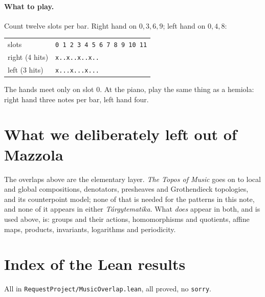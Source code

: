\documentclass[11pt,a4paper]{article}
\newcommand{\lean}[1]{\texttt{#1}}
\newcommand{\boxrow}[1]{\texttt{#1}}
\begin{document}
\paragraph{What to play.}
Count twelve slots per bar. Right hand on $0,3,6,9$; left hand on $0,4,8$:
\begin{center}
\begin{tabular}{@{}ll@{}}
slots  & \boxrow{0\,1\,2\,3\,4\,5\,6\,7\,8\,9\,10\,11}\\
right (4 hits) & \boxrow{x..x..x..x..}\\
left  (3 hits) & \boxrow{x...x...x...}\\
\end{tabular}
\end{center}
The hands meet only on slot $0$. At the piano, play the same thing as a hemiola:
right hand three notes per bar, left hand four.

\section{What we deliberately left out of Mazzola}

The overlaps above are the elementary layer. \emph{The Topos of Music} goes on to
local and global compositions, denotators, presheaves and Grothendieck topologies,
and its counterpoint model; none of that is needed for the patterns in this note,
and none of it appears in either \emph{Tárgytematika}. What \emph{does} appear in
both, and is used above, is: groups and their actions, homomorphisms and
quotients, affine maps, products, invariants, logarithms and periodicity.

\section{Index of the Lean results}\label{sec:index}

All in \lean{RequestProject/MusicOverlap.lean}, all proved, no \lean{sorry}.
\end{document}
